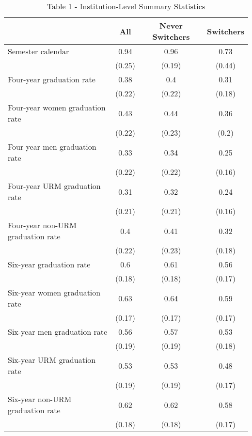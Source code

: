 \documentclass[8pt]{article}
\begin{document}
\begin{table}[htbp]\centering 
\captionsetup{skip=0pt}
\caption*{Table 1 - Institution-Level Summary Statistics}
\begin{tabular}{l c c c}\hline\hline
\multicolumn{1}{c}{\textbf{}}& All & Never Switchers
 & Switchers \\ \hline

Semester calendar 
& 0.94 & 0.96 & 0.73\\
& (0.25) & (0.19) & (0.44) \\

 Four-year graduation rate
 & 0.38 &  0.4 & 0.31\\
 & (0.22) & (0.22) & (0.18)\\
 
 Four-year women graduation rate
 & 0.43 &  0.44 & 0.36\\
 & (0.22) & (0.23) & (0.2)\\
 
 Four-year men graduation rate
 & 0.33 &  0.34 & 0.25\\
 & (0.22) & (0.22) & (0.16)\\
 
 Four-year URM graduation rate
 & 0.31 &  0.32 & 0.24\\
 & (0.21) & (0.21) & (0.16)\\
 
 Four-year non-URM graduation rate
 & 0.4 & 0.41 & 0.32\\
 & (0.22) & (0.23) & (0.18)\\
 
 Six-year graduation rate
 & 0.6 & 0.61& 0.56\\
 & (0.18) & (0.18) & (0.17)\\
 
 Six-year women graduation rate
 & 0.63 & 0.64& 0.59\\
 & (0.17) & (0.17) & (0.17)\\
 
 Six-year men graduation rate
 & 0.56 & 0.57 & 0.53\\
 & (0.19) & (0.19) & (0.18)\\
 
 Six-year URM graduation rate
 & 0.53 & 0.53 & 0.48\\
 & (0.19) & (0.19) & (0.17)\\
 
 Six-year non-URM graduation rate
 & 0.62 & 0.62 & 0.58\\
 & (0.18) & (0.18) & (0.17)\\
 

\end{tabular}
\end{table}
\end{document}
